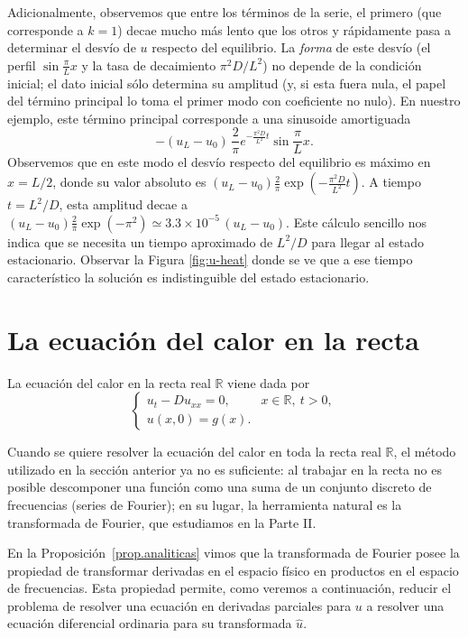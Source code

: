 \documentclass[12pt, a4paper]{amsbook}
\newcommand{\R}{{\mathbb R}}
\theoremstyle{remark}
\theoremstyle{definition}
\numberwithin{section}{chapter}
\numberwithin{subsection}{section}
\numberwithin{equation}{section}
\numberwithin{figure}{chapter}
\begin{document}
Adicionalmente, observemos que entre los términos de la serie, el primero (que corresponde a $k=1$) decae mucho más lento que los otros y rápidamente pasa a determinar el desvío de $u$ respecto del equilibrio. La {\em forma} de este desvío (el perfil $\sin\frac{\pi}{L}x$ y la tasa de decaimiento $\pi^2D/L^2$) no depende de la condición inicial; el dato inicial sólo determina su amplitud (y, si esta fuera nula, el papel del término principal lo toma el primer modo con coeficiente no nulo). En nuestro ejemplo, este término principal corresponde a una sinusoide amortiguada
$$
-(u_L-u_0)\,\frac{2}{\pi}e^{-\frac{\pi^2 D}{L^2}t} \sin\frac{\pi}{L}x.
$$
Observemos que en este modo el desvío respecto del equilibrio es máximo en $x=L/2$, donde su valor absoluto es $(u_L-u_0)\tfrac{2}{\pi}\exp(-\tfrac{\pi^2 D}{L^2}t)$. A tiempo $t=L^2/D$, esta amplitud decae a $(u_L-u_0)\tfrac{2}{\pi}\exp(-\pi^2)\simeq 3.3\times 10^{-5}\,(u_L-u_0)$. Este cálculo sencillo nos indica que se necesita un tiempo aproximado de $L^2/D$ para llegar al estado estacionario. Observar la Figura \ref{fig:u-heat} donde se ve que a ese tiempo característico la solución es indistinguible del estado estacionario.

\section{La ecuación del calor en la recta}

La ecuación del calor en la recta real $\R$ viene dada por
\begin{equation}\label{heat-R}
\begin{cases}
u_t - D u_{xx} = 0, & x\in\R,\ t>0,\\
u(x,0) = g(x).
\end{cases}
\end{equation}

Cuando se quiere resolver la ecuación del calor en toda la recta real $\R$, el método utilizado en la sección anterior ya no es suficiente: al trabajar en la recta no es posible descomponer una función como una suma de un conjunto discreto de frecuencias (series de Fourier); en su lugar, la herramienta natural es la transformada de Fourier, que estudiamos en la Parte II.

En la Proposición~\ref{prop.analiticas} vimos que la transformada de Fourier posee la propiedad de transformar derivadas en el espacio físico en productos en el espacio de frecuencias. Esta propiedad permite, como veremos a continuación, reducir el problema de resolver una ecuación en derivadas parciales para $u$ a resolver una ecuación diferencial ordinaria para su transformada $\hat u$.
\end{document}
